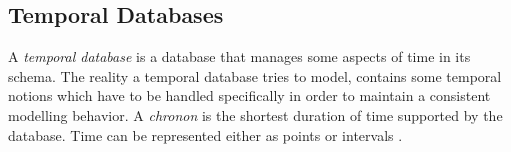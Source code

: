 %



\subsection{Temporal Databases}
A \emph{temporal database} is a database that manages some aspects of time in its schema. The reality a temporal database tries to model, contains some temporal notions which have to be handled specifically in order to maintain a consistent modelling behavior. A \emph{chronon} is the shortest duration of time supported by the database. Time can be represented either as points or intervals \cite{655777}.



